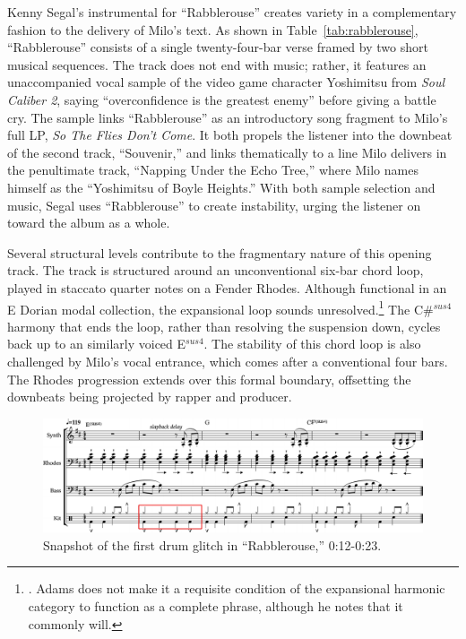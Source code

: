 Kenny Segal's instrumental for ``Rabblerouse'' creates variety in a complementary fashion to the delivery of Milo's text. As shown in Table~\ref{tab:rabblerouse}, ``Rabblerouse'' consists of a single twenty-four-bar verse framed by two short musical sequences. The track does not end with music; rather, it features an unaccompanied vocal sample of the video game character Yoshimitsu from \emph{Soul Caliber 2}, saying ``overconfidence is the greatest enemy'' before giving a battle cry. The sample links ``Rabblerouse'' as an introductory song fragment to Milo's full LP, \emph{So The Flies Don't Come}. It both propels the listener into the downbeat of the second track, ``Souvenir,'' and links thematically to a line Milo delivers in the penultimate track, ``Napping Under the Echo Tree,'' where Milo names himself as the ``Yoshimitsu of Boyle Heights.'' With both sample selection and music, Segal uses ``Rabblerouse'' to create instability, urging the listener on toward the album as a whole.

Several structural levels contribute to the fragmentary nature of this opening track. The track is structured around an unconventional six-bar chord loop, played in staccato quarter notes on a Fender Rhodes. Although functional in an E Dorian modal collection, the expansional loop sounds unresolved.\footnote{\cite{kyleadamsHarmonicSyntacticMotivic2020}. Adams does not make it a requisite condition of the expansional harmonic category to function as a complete phrase, although he notes that it commonly will.} The C\#$^{sus4}$ harmony that ends the loop, rather than resolving the suspension down, cycles back up to an similarly voiced E$^{sus4}$. The stability of this chord loop is also challenged by Milo's vocal entrance, which comes after a conventional four bars. The Rhodes progression extends over this formal boundary, offsetting the downbeats being projected by rapper and producer.

    \begin{figure}[ht]
        \centering
        \includegraphics[width=\textwidth]{images/figures/chp 02/012023rabblefirstglitch.pdf}
        \caption{Snapshot of the first drum glitch in ``Rabblerouse,'' 0:12-0:23.}
        \label{fig:rabblefirstglitch}
    \end{figure}

